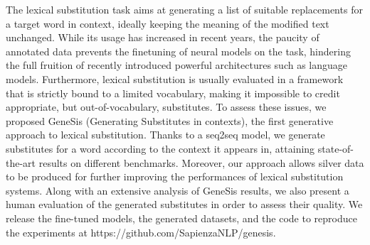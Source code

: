 The lexical substitution task aims at generating a  list of suitable replacements for a target word in context, ideally keeping the meaning of the modified text unchanged. While its usage has increased in recent years, the paucity of annotated data prevents the finetuning of neural models on the task,  hindering the full fruition of recently introduced powerful architectures such as language models. Furthermore, lexical substitution is usually evaluated in a framework that is strictly bound to a limited vocabulary, making it impossible to credit appropriate, but out-of-vocabulary, substitutes. To assess these issues, we proposed GeneSis (Generating Substitutes in contexts), the first generative approach to lexical substitution. Thanks to a seq2seq model, we generate substitutes for a word according to the context it appears in, attaining state-of-the-art results on different benchmarks. Moreover, our approach allows silver data to be produced for further improving the performances of lexical substitution systems. Along with an extensive analysis of GeneSis results, we also present a human evaluation of the generated substitutes in order to assess their quality. We release the fine-tuned models, the generated datasets, and the code to reproduce the experiments at https://github.com/SapienzaNLP/genesis.
